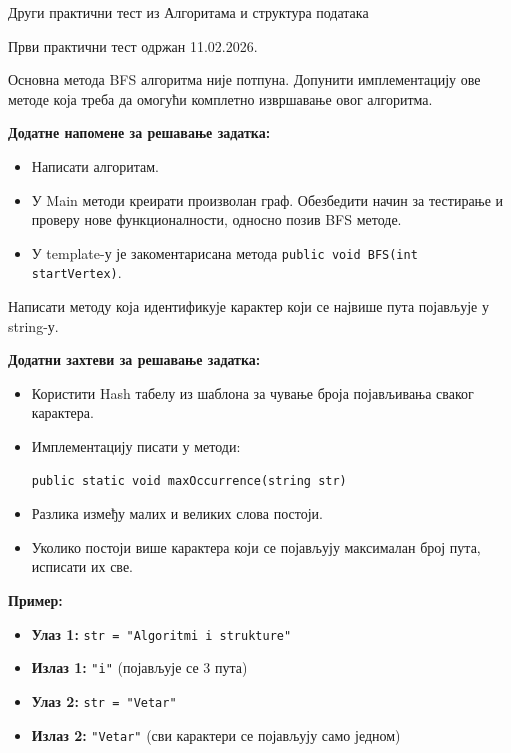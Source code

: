 
Други практични тест из Алгоритама и структура података

Први практични тест одржан 11.02.2026.

Основна метода BFS алгоритма није потпуна. Допунити имплементацију ове методе која треба да омогући комплетно извршавање овог алгоритма.

\textbf{Додатне напомене за решавање задатка:}
\begin{itemize}
	\item Написати алгоритам.
	\item У Main методи креирати произволан граф. Обезбедити начин за тестирање и проверу нове функционалности, односно позив BFS методе.
	\item У template-у је закоментарисана метода \texttt{public void BFS(int startVertex)}.
\end{itemize}

Написати методу која идентификује карактер који се највише пута појављује у string-у.

\textbf{Додатни захтеви за решавање задатка:}
\begin{itemize}
	\item Користити Hash табелу из шаблона за чување броја појављивања сваког карактера.
	\item Имплементацију писати у методи:
	\begin{Verbatim}[fontsize=\small]
public static void maxOccurrence(string str)
	\end{Verbatim}
	\item Разлика између малих и великих слова постоји.
	\item Уколико постоји више карактера који се појављују максималан број пута, исписати их све.
\end{itemize}

\textbf{Пример:}
\begin{itemize}
	\item \textbf{Улаз 1:} \texttt{str = "Algoritmi i strukture"}
	\item \textbf{Излаз 1:} \texttt{"i"} (појављује се 3 пута)
	\item \textbf{Улаз 2:} \texttt{str = "Vetar"}
	\item \textbf{Излаз 2:} \texttt{"Vetar"} (сви карактери се појављују само једном)
\end{itemize}

